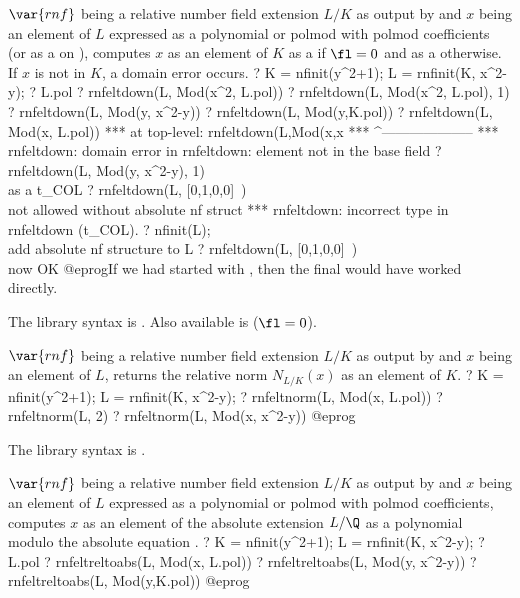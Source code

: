 \label{se:rnfeltdown}
$\var{rnf}$ being a relative number
field extension $L/K$ as output by  and $x$ being an element of
$L$ expressed as a polynomial or polmod with polmod coefficients (or as a
 on ), computes
$x$ as an element of $K$ as a  if $\fl = 0$ and as a 
otherwise. If $x$ is not in $K$, a domain error occurs.
\bprog
? K = nfinit(y^2+1); L = rnfinit(K, x^2-y);
? L.pol
? rnfeltdown(L, Mod(x^2, L.pol))
? rnfeltdown(L, Mod(x^2, L.pol), 1)
? rnfeltdown(L, Mod(y, x^2-y))
? rnfeltdown(L, Mod(y,K.pol))
? rnfeltdown(L, Mod(x, L.pol))
 ***   at top-level: rnfeltdown(L,Mod(x,x
 ***                 ^--------------------
 *** rnfeltdown: domain error in rnfeltdown: element not in the base field
? rnfeltdown(L, Mod(y, x^2-y), 1) \\ as a t_COL
? rnfeltdown(L, [0,1,0,0]~) \\ not allowed without absolute nf struct
  *** rnfeltdown: incorrect type in rnfeltdown (t_COL).
? nfinit(L); \\ add absolute nf structure to L
? rnfeltdown(L, [0,1,0,0]~) \\ now OK
@eprog\noindent If we had started with
, then the final would have worked directly.

The library syntax is .
Also available is
 ($\fl = 0$).

\label{se:rnfeltnorm}
$\var{rnf}$ being a relative number field extension $L/K$ as output by
 and $x$ being an element of $L$, returns the relative norm
$N_{L/K}(x)$ as an element of $K$.
\bprog
? K = nfinit(y^2+1); L = rnfinit(K, x^2-y);
? rnfeltnorm(L, Mod(x, L.pol))
? rnfeltnorm(L, 2)
? rnfeltnorm(L, Mod(x, x^2-y))
@eprog

The library syntax is .

\label{se:rnfeltreltoabs}
$\var{rnf}$ being a relative
number field extension $L/K$ as output by  and $x$ being an
element of $L$ expressed as a polynomial or polmod with polmod
coefficients, computes $x$ as an element of the absolute extension $L/\Q$ as
a polynomial modulo the absolute equation .
\bprog
? K = nfinit(y^2+1); L = rnfinit(K, x^2-y);
? L.pol
? rnfeltreltoabs(L, Mod(x, L.pol))
? rnfeltreltoabs(L, Mod(y, x^2-y))
? rnfeltreltoabs(L, Mod(y,K.pol))
@eprog

